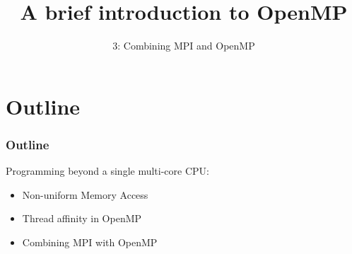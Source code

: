 \documentclass{beamer}
\title{A brief introduction to OpenMP}
\subtitle{3: Combining MPI and OpenMP}
\begin{document}
\frame{\titlepage}

\section{Outline}
\begin{frame}
\frametitle{Outline}

%

Programming beyond a single multi-core CPU:
\begin{itemize}
  \item Non-uniform Memory Access
  \item Thread affinity in OpenMP
  \item Combining MPI with OpenMP
\end{itemize}
\end{frame}
\end{document}
